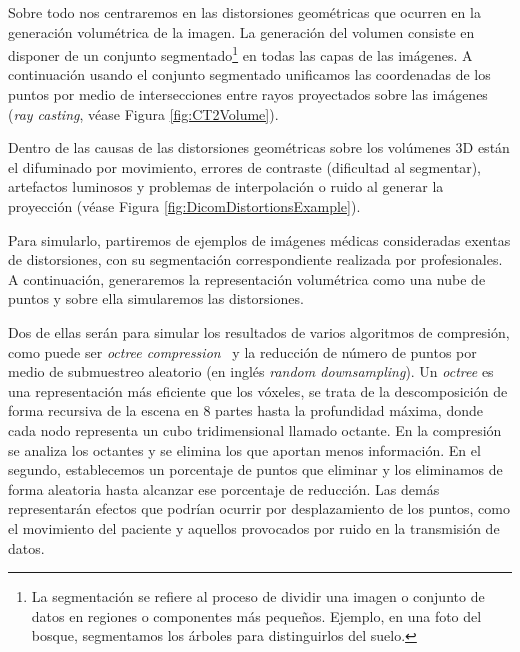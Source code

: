 Sobre todo nos centraremos en las distorsiones geométricas que ocurren en la 
generación volumétrica de la imagen. La generación del volumen consiste en 
disponer de un conjunto segmentado\footnote{
La segmentación se refiere al proceso de dividir una imagen o conjunto de datos en regiones o componentes más pequeños. 
Ejemplo, en una foto del bosque, segmentamos los árboles para distinguirlos del suelo.
} en todas las capas de las imágenes. A continuación usando el conjunto segmentado 
unificamos las coordenadas de los puntos por medio de intersecciones entre rayos 
proyectados sobre las imágenes (\emph{ray casting}, véase Figura \ref{fig:CT2Volume}).


Dentro de las causas de las distorsiones geométricas sobre los volúmenes 
3D están el difuminado por movimiento, errores de contraste (dificultad al segmentar),
artefactos luminosos y problemas de interpolación o ruido al generar la proyección (véase Figura \ref{fig:DicomDistortionsExample}). 

Para simularlo, partiremos de ejemplos de imágenes médicas consideradas exentas de 
distorsiones, con su segmentación correspondiente realizada por profesionales.
A continuación, generaremos la representación volumétrica como una nube de puntos 
y sobre ella simularemos las distorsiones. 

Dos de ellas serán para simular los resultados de varios algoritmos de compresión, 
como puede ser \emph{octree compression}~\cite{OctreeCompression} y la reducción de número de puntos 
por medio de submuestreo aleatorio (en inglés \emph{random downsampling}). 
Un \emph{octree} es una representación más eficiente que los vóxeles, se trata 
de la descomposición de forma recursiva de la escena en 8 partes hasta 
la profundidad máxima, donde cada nodo representa un cubo tridimensional 
llamado octante. En la compresión se analiza los octantes y se elimina los que aportan 
menos información. 
En el segundo, establecemos un porcentaje de puntos que eliminar y los eliminamos 
de forma aleatoria hasta alcanzar ese porcentaje de reducción.
Las demás representarán efectos que podrían ocurrir por desplazamiento de los puntos, 
como el movimiento del paciente y aquellos provocados por ruido en la transmisión de datos.

